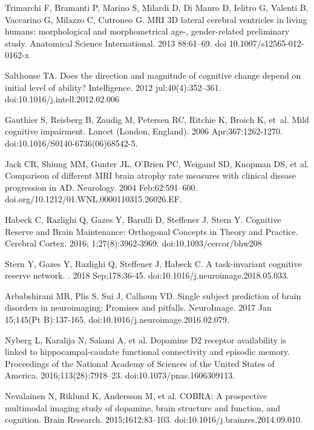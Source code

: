 \documentclass[10pt,letterpaper]{article}
\begin{document}
\begin{thebibliography}{10}
Trimarchi F, Bramanti P, Marino S, Milardi D, Di Mauro D, Ielitro G, Valenti B, Vaccarino G, Milazzo C, Cutroneo G. 
\newblock MRI 3D lateral cerebral ventricles in living humans: morphological and morphometrical age-, gender-related preliminary study.
\newblock Anatomical Science International. 2013 88:61–69. 
doi 10.1007/s12565-012-0162-x

Salthouse TA.
\newblock Does the direction and magnitude of cognitive change depend on initial level of ability?
\newblock Intelligence. 2012 jul;40(4):352--361. doi:10.1016/j.intell.2012.02.006


Gauthier S, Reisberg B, Zaudig M, Petersen RC, Ritchie K, Broich K, et~al.
\newblock Mild cognitive impairment.
\newblock Lancet (London, England). 2006 Apr;367:1262-1270. doi:10.1016/S0140-6736(06)68542-5.

Jack CR, Shiung MM, Gunter JL, O’Brien PC, Weigand SD, Knopman DS, et al. 
\newblock Comparison of different MRI brain atrophy rate measures with clinical disease progression in AD. \newblock Neurology. 2004 Feb;62:591–600. doi.org/10.1212/01.WNL.0000110315.26026.EF.


Habeck C, Razlighi Q, Gazes Y, Barulli D, Steffener J, Stern Y.
\newblock Cognitive Reserve and Brain Maintenance: Orthogonal Concepts in Theory and Practice.
\newblock Cerebral Cortex. 2016; 1;27(8):3962-3969. doi:10.1093/cercor/bhw208


Stern Y, Gazes Y, Razlighi Q, Steffener J, Habeck C.
\newblock A task-invariant cognitive reserve network.
. 2018 Sep;178:36-45. doi:10.1016/j.neuroimage.2018.05.033.

Arbabshirani MR, Plis S, Sui J, Calhoun VD.
\newblock Single subject prediction of brain disorders in neuroimaging: Promises and pitfalls.
\newblock NeuroImage.  2017 Jan 15;145(Pt B):137-165. doi:10.1016/j.neuroimage.2016.02.079.



Nyberg L, Karalija N, Salami A, et al.
\newblock Dopamine D2 receptor availability is linked to hippocampal-caudate functional connectivity and episodic memory. 
\newblock Proceedings of the National Academy of Sciences of the United States of America. 2016;113(28):7918–23. doi:10.1073/pnas.1606309113.

 
  
\newblock Nevalainen N, Riklund K, Andersson M, et al.
\newblock COBRA: A prospective multimodal imaging study of dopamine, brain structure and function, and cognition. 
\newblock Brain Research. 2015;1612:83–103. doi:10.1016/j.brainres.2014.09.010.



\end{thebibliography}
\end{document}
